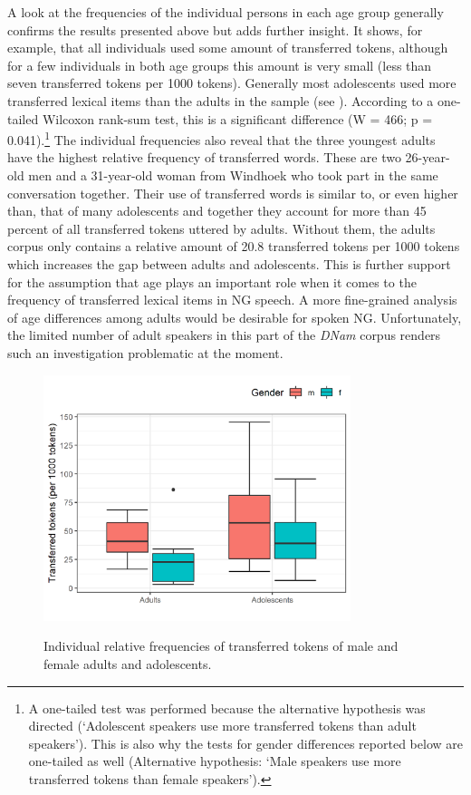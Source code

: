 \documentclass[output=paper]{langsci/langscibook}
\begin{document}
A look at the frequencies of the individual persons in each age group generally confirms the results presented above but adds further insight. It shows, for example, that all individuals used some amount of transferred tokens, although for a few individuals in both age groups this amount is very small (less than seven transferred tokens per 1000 tokens). Generally most adolescents used more transferred lexical items than the adults in the sample (see ). According to a one-tailed Wilcoxon rank-sum test, this is a significant difference (W = 466; p = 0.041).\footnote{A one-tailed test was performed because the alternative hypothesis was directed (‘Adolescent speakers use more transferred tokens than adult speakers’). This is also why the tests for gender differences reported below are one-tailed as well (Alternative hypothesis: ‘Male speakers use more transferred tokens than female speakers’).} The individual frequencies also reveal that the three youngest adults have the highest relative frequency of transferred words. These are two 26-year-old men and a 31-year-old woman from Windhoek who took part in the same conversation together. Their use of transferred words is similar to, or even higher than, that of many adolescents and together they account for more than 45 percent of all transferred tokens uttered by adults. Without them, the adults corpus only contains a relative amount of 20.8 transferred tokens per 1000 tokens which increases the gap between adults and adolescents. This is further support for the assumption that age plays an important role when it comes to the frequency of transferred lexical items in NG speech. A more fine-grained analysis of age differences among adults would be desirable for spoken NG. Unfortunately, the limited number of adult speakers in this part of the \textit{DNam} corpus renders such an investigation problematic at the moment.

  
\begin{figure}
\includegraphics[width=0.8\textwidth]{figures/brackefig1.png}
 \label{fig:bracke:1}
\caption{Individual relative frequencies of transferred tokens of male and female adults and adolescents.}
 \end{figure}
\end{document}
